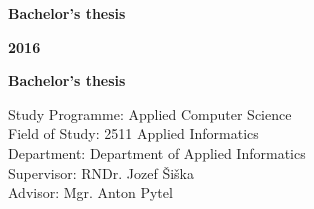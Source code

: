 \begin{center}
\centerline{\LARGE\sc\textbf\skola}
\sc\LARGE\textbf\fakulta
\end{center}

\vspace*{8cm}

\begin{center}
\begin{minipage}{0.8\textwidth}
\begin{center}
 \LARGE\sc\textbf\nazov
 \vspace{1em}
 \centerline{\Large\bf Bachelor’s thesis}
\end{center}
\end{minipage}
\end{center}

\vfill
\noindent
 {\bf 2016}  \hfill {\bf \autor}
\thispagestyle{empty}



\newpage
\begin{center}
\centerline{\LARGE\sc\textbf\skola}
\sc\LARGE\textbf\fakulta
\end{center}

\vspace*{8cm}

\begin{center}
\begin{minipage}{0.8\textwidth}
\begin{center}
 \LARGE\sc\textbf\nazov 
\end{center}
\vspace{1em}
\centerline{\Large\bf Bachelor’s thesis}
\end{minipage}
\end{center}

\vspace{5cm}

\linespread{1.3}%
\selectfont

\noindent
Study Programme: \hspace{0.8em} Applied Computer Science\\
Field of Study:  \hspace{2.4em} 2511 Applied Informatics\\
Department:  \hspace{3.3em} Department of Applied Informatics\\
Supervisor:  \hspace{3.7em} RNDr. Jozef Šiška\\
Advisor:	 \hspace{4.8em} Mgr. Anton Pytel

